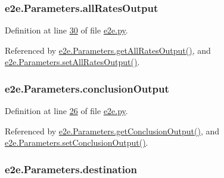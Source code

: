 \subsubsection[{\texorpdfstring{all\+Rates\+Output}{allRatesOutput}}]{\setlength{\rightskip}{0pt plus 5cm}e2e.\+Parameters.\+all\+Rates\+Output}\hypertarget{classe2e_1_1_parameters_ac5dfd879a297879921d905de68f7febb}{}\label{classe2e_1_1_parameters_ac5dfd879a297879921d905de68f7febb}


Definition at line \hyperlink{e2e_8py_source_l00030}{30} of file \hyperlink{e2e_8py_source}{e2e.\+py}.



Referenced by \hyperlink{e2e_8py_source_l00072}{e2e.\+Parameters.\+get\+All\+Rates\+Output()}, and \hyperlink{e2e_8py_source_l00069}{e2e.\+Parameters.\+set\+All\+Rates\+Output()}.

\subsubsection[{\texorpdfstring{conclusion\+Output}{conclusionOutput}}]{\setlength{\rightskip}{0pt plus 5cm}e2e.\+Parameters.\+conclusion\+Output}\hypertarget{classe2e_1_1_parameters_ad5967b78ebf5c8778e423413053015a7}{}\label{classe2e_1_1_parameters_ad5967b78ebf5c8778e423413053015a7}


Definition at line \hyperlink{e2e_8py_source_l00026}{26} of file \hyperlink{e2e_8py_source}{e2e.\+py}.



Referenced by \hyperlink{e2e_8py_source_l00048}{e2e.\+Parameters.\+get\+Conclusion\+Output()}, and \hyperlink{e2e_8py_source_l00045}{e2e.\+Parameters.\+set\+Conclusion\+Output()}.

\subsubsection[{\texorpdfstring{destination}{destination}}]{\setlength{\rightskip}{0pt plus 5cm}e2e.\+Parameters.\+destination}\hypertarget{classe2e_1_1_parameters_ad2cdf746b8890c53a9cab6fd7df7043b}{}\label{classe2e_1_1_parameters_ad2cdf746b8890c53a9cab6fd7df7043b}


